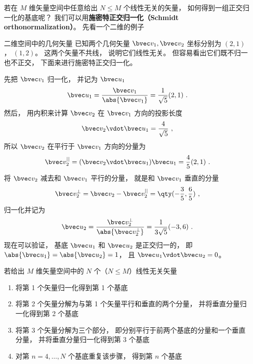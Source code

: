 

若在 $M$ 维矢量空间中任意给出 $N \leqslant M$ 个线性无关的矢量， 如何得到一组正交归一化的基底呢？ 我们可以用\textbf{施密特正交归一化（Schmidt orthonormalization）}。 先看一个二维的例子

\begin{example}{二维空间中的几何矢量}
已知两个几何矢量 $\bvec v_1, \bvec v_2$ 坐标分别为 $(2, 1)$， $(1, 2)$。 这两个矢量不共线， 说明它们线性无关。 但容易看出它们既不归一也不正交， 下面来进行施密特正交归一化。

先把 $\bvec v_1$ 归一化， 并记为 $\bvec u_1$
\begin{equation}
\bvec u_1 = \frac{\bvec v_1}{\abs{\bvec v_1}} = \frac{1}{\sqrt{5}} (2, 1)~.
\end{equation}
然后， 用内积来计算 $\bvec v_2$ 在 $\bvec v_1$ 方向的投影长度
\begin{equation}
\bvec v_2 \vdot \bvec u_1 = \frac{4}{\sqrt{5}}~,
\end{equation}
所以 $\bvec v_2$ 在平行于 $\bvec v_1$ 方向的分量为
\begin{equation}
\bvec v_2^{||} =  (\bvec v_2 \vdot \bvec u_1)\bvec u_1 = \frac{4}{5} (2, 1)~.
\end{equation}
将 $\bvec v_2$ 减去和 $\bvec v_1$ 平行的分量， 就是和 $\bvec v_1$ 垂直的分量
\begin{equation}
\bvec v_2^\bot = \bvec v_2 - \bvec v_2^{||} = \qty(-\frac35, \frac65)~,
\end{equation}
归一化并记为
\begin{equation}
\bvec u_2 = \frac{\bvec v_2^\bot}{\abs{\bvec v_2^\bot}} = \frac{1}{3\sqrt{5}} (-3, 6)~.
\end{equation}
现在可以验证， 基底 $\bvec u_1$ 和 $\bvec u_2$ 是正交归一的， 即 $\abs{\bvec u_1} = \abs{\bvec u_2} = 1$， 且 $\bvec u_1 \vdot \bvec u_2 = 0$。
\end{example}

若给出 $M$ 维矢量空间中的 $N$ 个（$N \leqslant M$）线性无关矢量
\begin{enumerate}
\item 将第 1 个矢量归一化得到第 1 个基底
\item 将第 2 个矢量分解为与第 1 个矢量平行和垂直的两个分量， 并将垂直分量归一化得到第 2 个基底
\item 将第 3 个矢量分解为三个部分， 即分别平行于前两个基底的分量和一个垂直分量， 并将垂直分量归一化得到第 3 个基底
\item 对第 $n = 4, \dots , N$ 个基底重复该步骤， 得到第 $n$ 个基底
\end{enumerate}

